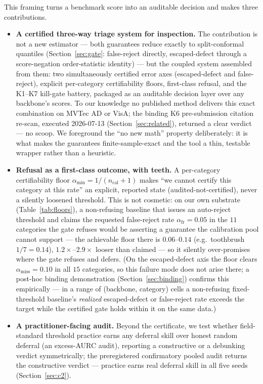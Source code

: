 \documentclass[11pt]{article}
\begin{document}
This framing turns a benchmark score into an auditable decision and makes three contributions.

\begin{itemize}
  \item \textbf{A certified three-way triage system for inspection.} The contribution is not
        a new estimator --- both guarantees reduce exactly to split-conformal quantiles
        (Section~\ref{sec:gate}: false-reject directly, escaped-defect through a score-negation
        order-statistic identity) --- but the coupled system assembled from them: two
        simultaneously certified error axes (escaped-defect and false-reject), explicit
        per-category certifiability floors, first-class refusal, and the K1--K7 kill-gate battery,
        packaged as an auditable decision layer over any backbone's scores. To our knowledge no
        published method delivers this exact combination on MVTec AD or VisA; the binding K6
        pre-submission citation re-scan, executed 2026-07-13 (Section~\ref{sec:related}), returned a
        clear verdict --- no scoop. We foreground the ``no new math''
        property deliberately: it is what makes the guarantees finite-sample-exact and the tool a
        thin, testable wrapper rather than a heuristic.
  \item \textbf{Refusal as a first-class outcome, with teeth.} A per-category certifiability floor
        $\alpha_{\min}=1/(n_{\text{cal}}+1)$ makes ``we cannot certify this category at this rate''
        an explicit, reported state (audited-not-certified), never a silently loosened threshold.
        This is not cosmetic: on our own substrate (Table~\ref{tab:floors}), a non-refusing baseline
        that issues an auto-reject threshold and claims the requested false-reject rate
        $\alpha_{\text{fr}}=0.05$ in the $11$ categories the gate refuses would be asserting a
        guarantee the calibration pool cannot support --- the achievable floor there is
        $0.06$--$0.14$ (e.g.\ toothbrush $1/7=0.14$), $1.2\times$--$2.9\times$ looser than claimed --- so
        it silently over-promises where the gate refuses and defers. (On the escaped-defect axis the
        floor clears $\alpha_{\text{miss}}=0.10$ in all $15$ categories, so this failure mode does
        not arise there; a post-hoc binding demonstration (Section~\ref{sec:binding}) confirms this
        empirically --- in a range of (backbone, category) cells a non-refusing fixed-threshold
        baseline's \emph{realized} escaped-defect or false-reject rate exceeds the target while the
        certified gate holds within it on the same data.)
  \item \textbf{A practitioner-facing audit.} Beyond the certificate, we test whether
        field-standard threshold practice earns any deferral skill over honest random deferral
        (an excess-AURC audit), reporting a constructive or a debunking verdict symmetrically; the
        preregistered confirmatory pooled audit returns the constructive verdict --- practice earns
        real deferral skill in all five seeds (Section~\ref{sec:c2}).
\end{itemize}
\end{document}
